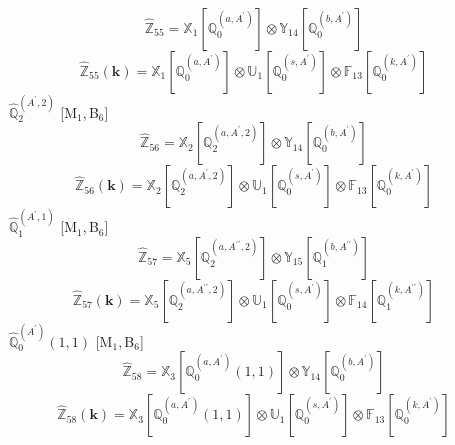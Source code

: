 \documentclass[fleqn,10pt,landscape]{article}
\begin{document}
\begin{itemize}
\begin{dmath*}
\hat{\mathbb{Z}}_{55}=\mathbb{X}_{1}[\mathbb{Q}_{0}^{(a,A^{\prime})}] \otimes\mathbb{Y}_{14}[\mathbb{Q}_{0}^{(b,A^{\prime})}]
\end{dmath*}
\begin{dmath*}
\hat{\mathbb{Z}}_{55}(\bm{k})=\mathbb{X}_{1}[\mathbb{Q}_{0}^{(a,A^{\prime})}] \otimes\mathbb{U}_{1}[\mathbb{Q}_{0}^{(s,A^{\prime})}] \otimes\mathbb{F}_{13}[\mathbb{Q}_{0}^{(k,A^{\prime})}]
\end{dmath*}
\vspace{4mm}
\noindent {} $\,\,\,\hat{\mathbb{Q}}_{2}^{(A^{\prime},2)}$ [M$_{1}$,\,B$_{6}$]
\begin{dmath*}
\hat{\mathbb{Z}}_{56}=\mathbb{X}_{2}[\mathbb{Q}_{2}^{(a,A^{\prime},2)}] \otimes\mathbb{Y}_{14}[\mathbb{Q}_{0}^{(b,A^{\prime})}]
\end{dmath*}
\begin{dmath*}
\hat{\mathbb{Z}}_{56}(\bm{k})=\mathbb{X}_{2}[\mathbb{Q}_{2}^{(a,A^{\prime},2)}] \otimes\mathbb{U}_{1}[\mathbb{Q}_{0}^{(s,A^{\prime})}] \otimes\mathbb{F}_{13}[\mathbb{Q}_{0}^{(k,A^{\prime})}]
\end{dmath*}
\vspace{4mm}
\noindent {} $\,\,\,\hat{\mathbb{Q}}_{1}^{(A^{\prime},1)}$ [M$_{1}$,\,B$_{6}$]
\begin{dmath*}
\hat{\mathbb{Z}}_{57}=\mathbb{X}_{5}[\mathbb{Q}_{2}^{(a,A^{\prime\prime},2)}] \otimes\mathbb{Y}_{15}[\mathbb{Q}_{1}^{(b,A^{\prime\prime})}]
\end{dmath*}
\begin{dmath*}
\hat{\mathbb{Z}}_{57}(\bm{k})=\mathbb{X}_{5}[\mathbb{Q}_{2}^{(a,A^{\prime\prime},2)}] \otimes\mathbb{U}_{1}[\mathbb{Q}_{0}^{(s,A^{\prime})}] \otimes\mathbb{F}_{14}[\mathbb{Q}_{1}^{(k,A^{\prime\prime})}]
\end{dmath*}
\vspace{4mm}
\noindent {} $\,\,\,\hat{\mathbb{Q}}_{0}^{(A^{\prime})}(1,1)$ [M$_{1}$,\,B$_{6}$]
\begin{dmath*}
\hat{\mathbb{Z}}_{58}=\mathbb{X}_{3}[\mathbb{Q}_{0}^{(a,A^{\prime})}(1,1)] \otimes\mathbb{Y}_{14}[\mathbb{Q}_{0}^{(b,A^{\prime})}]
\end{dmath*}
\begin{dmath*}
\hat{\mathbb{Z}}_{58}(\bm{k})=\mathbb{X}_{3}[\mathbb{Q}_{0}^{(a,A^{\prime})}(1,1)] \otimes\mathbb{U}_{1}[\mathbb{Q}_{0}^{(s,A^{\prime})}] \otimes\mathbb{F}_{13}[\mathbb{Q}_{0}^{(k,A^{\prime})}]
\end{dmath*}

\end{itemize}
\end{document}
